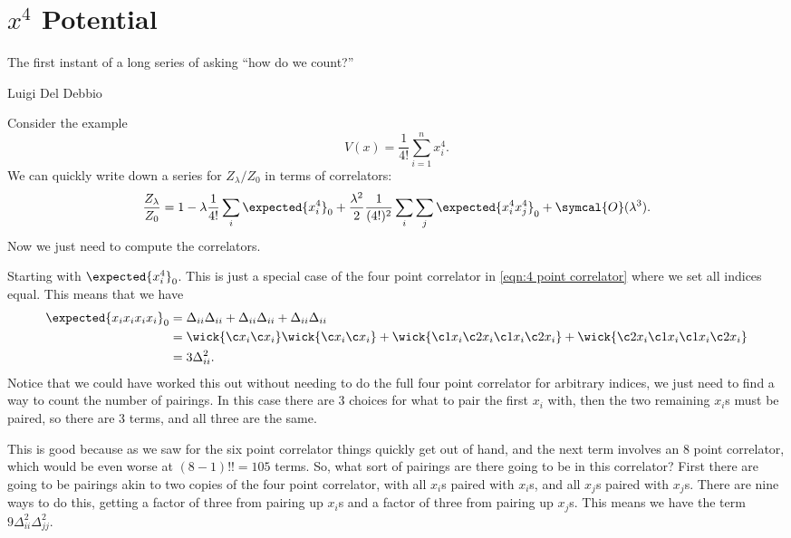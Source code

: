 \documentclass[fleqn]{NotesClass}
\newcommand{\order}{\symcal{O}}
\begin{document}
    \section{\texorpdfstring{\(x^4\)}{x to the four} Potential}
    \epigraph{The first instant of a long series of asking \enquote{how do we count?}}{Luigi Del Debbio}
    Consider the example
    \begin{equation}
        V(x) = \frac{1}{4!} \sum_{i = 1}^n x_i^4.
    \end{equation}
    We can quickly write down a series for \(Z_\lambda/Z_0\) in terms of correlators:
    \begin{equation}
        \frac{Z_\lambda}{Z_0} = 1 - \lambda \frac{1}{4!} \sum_i \expected{x_i^4}_0 + \frac{\lambda^2}{2}\frac{1}{(4!)^2} \sum_i \sum_j \expected{x_i^4 x_j^4}_0 + \order(\lambda^3).
    \end{equation}
    Now we just need to compute the correlators.
    
    Starting with \(\expected{x_i^4}_0\).
    This is just a special case of the four point correlator in \cref{eqn:4 point correlator} where we set all indices equal.
    This means that we have
    \begin{align}
        \expected{x_ix_ix_ix_i}_0 &= \Delta_{ii}\Delta_{ii} + \Delta_{ii}\Delta_{ii} + \Delta_{ii}\Delta_{ii}\\
        &= \wick{\c x_i \c x_i} \wick{\c x_i \c x_i} + \wick{\c1 x_i \c2 x_i \c1 x_i \c2 x_i} + \wick{\c2 x_i \c1 x_i \c1 x_i \c2 x_i}\\
        &= 3 \Delta_{ii}^2.
    \end{align}
    Notice that we could have worked this out without needing to do the full four point correlator for arbitrary indices, we just need to find a way to count the number of pairings.
    In this case there are 3 choices for what to pair the first \(x_i\) with, then the two remaining \(x_i\)s must be paired, so there are 3 terms, and all three are the same.
    
    This is good because as we saw for the six point correlator things quickly get out of hand, and the next term involves an 8 point correlator, which would be even worse at \((8 - 1)!! = 105\) terms.
    So, what sort of pairings are there going to be in this correlator?
    First there are going to be pairings akin to two copies of the four point correlator, with all \(x_i\)s paired with \(x_i\)s, and all \(x_j\)s paired with \(x_j\)s.
    There are nine ways to do this, getting a factor of three from pairing up \(x_i\)s and a factor of three from pairing up \(x_j\)s.
    This means we have the term \(9\Delta_{ii}^2\Delta_{jj}^2\).
    
\end{document}
